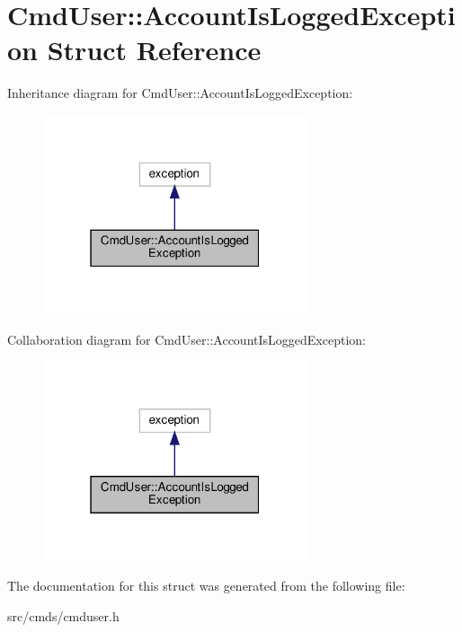 \hypertarget{structCmdUser_1_1AccountIsLoggedException}{}\section{Cmd\+User\+:\+:Account\+Is\+Logged\+Exception Struct Reference}
\label{structCmdUser_1_1AccountIsLoggedException}


Inheritance diagram for Cmd\+User\+:\+:Account\+Is\+Logged\+Exception\+:
\nopagebreak
\begin{figure}[H]
\begin{center}
\leavevmode
\includegraphics[width=220pt]{structCmdUser_1_1AccountIsLoggedException__inherit__graph}
\end{center}
\end{figure}


Collaboration diagram for Cmd\+User\+:\+:Account\+Is\+Logged\+Exception\+:
\nopagebreak
\begin{figure}[H]
\begin{center}
\leavevmode
\includegraphics[width=220pt]{structCmdUser_1_1AccountIsLoggedException__coll__graph}
\end{center}
\end{figure}


The documentation for this struct was generated from the following file\+:\begin{DoxyCompactItemize}
\item 
src/cmds/cmduser.\+h\end{DoxyCompactItemize}
